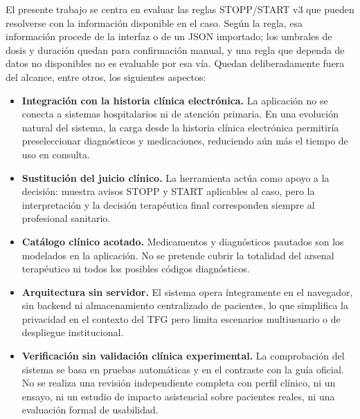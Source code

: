 \label{sec:limitaciones}
El presente trabajo se centra en evaluar las reglas STOPP/START v3 que pueden
resolverse con la información disponible en el caso. Según la regla, esa
información procede de la interfaz o de un JSON importado; los umbrales de dosis
y duración quedan para confirmación manual, y una regla que dependa de datos no
disponibles no es evaluable por esa vía.
Quedan deliberadamente fuera del alcance, entre otros, los siguientes
aspectos:
\begin{itemize}
  \item \textbf{Integración con la historia clínica electrónica.}
  La aplicación no se conecta a sistemas hospitalarios ni de atención
  primaria. En una evolución natural del sistema, la carga desde la
  historia clínica electrónica permitiría preseleccionar diagnósticos y
  medicaciones, reduciendo aún más el tiempo de uso en consulta.
  \item \textbf{Sustitución del juicio clínico.}
  La herramienta actúa como apoyo a la decisión: muestra avisos STOPP y
  START aplicables al caso, pero la interpretación y la decisión
  terapéutica final corresponden siempre al profesional sanitario.
  \item \textbf{Catálogo clínico acotado.}
  Medicamentos y diagnósticos pautados son los modelados en la
  aplicación. No se pretende cubrir la totalidad del arsenal terapéutico
  ni todos los posibles códigos diagnósticos.
  \item \textbf{Arquitectura sin servidor.}
  El sistema opera íntegramente en el navegador, sin backend ni
  almacenamiento centralizado de pacientes, lo que simplifica la
  privacidad en el contexto del TFG pero limita escenarios multiusuario
  o de despliegue institucional.
  \item \textbf{Verificación sin validación clínica experimental.}
  La comprobación del sistema se basa en pruebas automáticas y en el
  contraste con la guía oficial. No se realiza una revisión independiente
  completa con perfil clínico, ni un ensayo, ni un estudio de impacto
  asistencial sobre pacientes reales, ni una evaluación formal de usabilidad.
\end{itemize}
